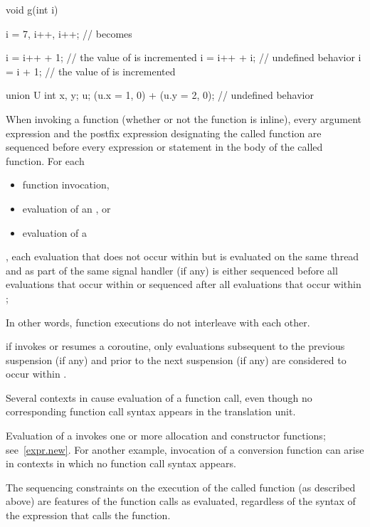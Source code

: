 \begin{example}
\begin{codeblock}
void g(int i) {
  i = 7, i++, i++;              //  becomes 

  i = i++ + 1;                  // the value of  is incremented
  i = i++ + i;                  // undefined behavior
  i = i + 1;                    // the value of  is incremented

  union U { int x, y; } u;
  (u.x = 1, 0) + (u.y = 2, 0);  // undefined behavior
}
\end{codeblock}
\end{example}

\pnum
When invoking a function (whether or not the function is inline),
every argument expression and
the postfix expression designating the called function
are sequenced before every expression or statement
in the body of the called function.
For each
\begin{itemize}
\item function invocation,
\item evaluation of an , or
\item evaluation of a 
\end{itemize}
,
each evaluation that does not occur within  but
is evaluated on the same thread and as part of the same signal handler (if any)
is either sequenced before all evaluations that occur within 
or sequenced after all evaluations that occur within ;
\begin{footnote}
In other words,
function executions do not interleave with each other.
\end{footnote}
if  invokes or resumes a coroutine,
only evaluations
subsequent to the previous suspension (if any) and
prior to the next suspension (if any)
are considered to occur within .

Several contexts in \Cpp{} cause evaluation of a function call, even
though no corresponding function call syntax appears in the translation
unit.
\begin{example}
Evaluation of a  invokes one or more allocation
and constructor functions; see~\ref{expr.new}. For another example,
invocation of a conversion function can arise in
contexts in which no function call syntax appears.
\end{example}
The sequencing constraints on the execution of the called function (as
described above) are features of the function calls as evaluated,
regardless of the syntax of the expression that calls the function.%
%

